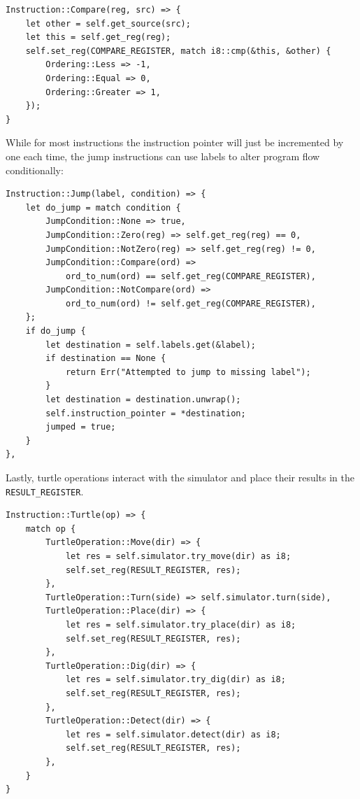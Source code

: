 \documentclass{report}
\begin{document}
\begin{verbatim}
Instruction::Compare(reg, src) => {
    let other = self.get_source(src);
    let this = self.get_reg(reg);
    self.set_reg(COMPARE_REGISTER, match i8::cmp(&this, &other) {
        Ordering::Less => -1,
        Ordering::Equal => 0,
        Ordering::Greater => 1,
    });
}
\end{verbatim}

While for most instructions the instruction pointer will just be incremented by one each time, the jump instructions can use labels to alter program flow conditionally:

\begin{verbatim}
Instruction::Jump(label, condition) => {
    let do_jump = match condition {
        JumpCondition::None => true,
        JumpCondition::Zero(reg) => self.get_reg(reg) == 0,
        JumpCondition::NotZero(reg) => self.get_reg(reg) != 0,
        JumpCondition::Compare(ord) =>
            ord_to_num(ord) == self.get_reg(COMPARE_REGISTER),
        JumpCondition::NotCompare(ord) =>
            ord_to_num(ord) != self.get_reg(COMPARE_REGISTER),
    };
    if do_jump {
        let destination = self.labels.get(&label);
        if destination == None {
            return Err("Attempted to jump to missing label");
        }
        let destination = destination.unwrap();
        self.instruction_pointer = *destination;
        jumped = true;
    }
},
\end{verbatim}

Lastly, turtle operations interact with the simulator and place their results in the \verb|RESULT_REGISTER|.

\begin{verbatim}
Instruction::Turtle(op) => {
    match op {
        TurtleOperation::Move(dir) => {
            let res = self.simulator.try_move(dir) as i8;
            self.set_reg(RESULT_REGISTER, res);
        },
        TurtleOperation::Turn(side) => self.simulator.turn(side),
        TurtleOperation::Place(dir) => {
            let res = self.simulator.try_place(dir) as i8;
            self.set_reg(RESULT_REGISTER, res);
        },
        TurtleOperation::Dig(dir) => {
            let res = self.simulator.try_dig(dir) as i8;
            self.set_reg(RESULT_REGISTER, res);
        },
        TurtleOperation::Detect(dir) => {
            let res = self.simulator.detect(dir) as i8;
            self.set_reg(RESULT_REGISTER, res);
        },
    }
}
\end{verbatim}
\end{document}
